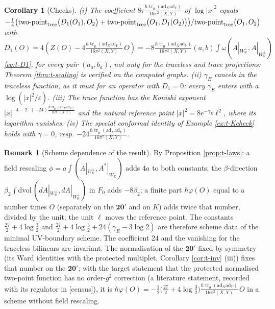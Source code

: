 \documentclass[11pt]{report}
\theoremstyle{plain}
\newtheorem{corollary}[theorem]{Corollary}
\theoremstyle{definition}
\newtheorem{remark}[theorem]{Remark}
\numberwithin{equation}{chapter}
\newcommand{\unit}{\tfrac{\hbar\operatorname{tr}_{\mathfrak g}(\mathrm{ad}_X\mathrm{ad}_Y)}{16\pi^2(X,Y)}}
\newcommand{\Wp}{W_{\mathbb R}^\perp}
\newcommand{\TPz}[2]{\mathrm{two\mbox{-}point}_{\rm tree}\big(#1,#2\big)}
\begin{document}
\begin{corollary}[Checks]
\label{cor:t-checks}
(i) The coefficient $8\tau\unit$ of $\log|x|^2$ equals $-\tfrac14\big(\TPz{D_1(O_1)}{O_2}+\TPz{O_1}{D_1(O_2)}\big)/\TPz{O_1}{O_2}$ with $D_1(O)=4(Z(O)-4\unit\,O)=-8\unit(a,b)\int\omega(A|_{\Wp},A|_{\Wp})$ \eqref{eq:t-D1}, for every pair $(a_a,b_a)$, not only for the traceless and trace projections: Theorem \ref{thm:t-scaling} is verified on the computed graphs. (ii) $\gamma_E$ cancels in the traceless function, as it must for an operator with $D_1=0$: every $\gamma_E$ enters with a $\log(|x|^2/\varepsilon)$. (iii) The trace function has the Konishi exponent $|x|^{-4-2\cdot(-24)\unit}$ and the natural reference point $|x|^2=8e^{-\gamma_E}\ell^2$, where its logarithm vanishes. (iv) The special conformal identity of Example \ref{ex:t-Kcheck} holds with $\gamma=0$, resp. $-24\unit$.
\end{corollary}

\begin{remark}[Scheme dependence of the result]
By Proposition \ref{prop:t-laws}: a field rescaling $\phi=a\int(A|_{\Wp},A^*|_{\Wp})$ adds $4a$ to both constants; the $\beta$-direction $\beta_2\int\mathrm{dvol}\,(dA|_{\Wp},dA|_{\Wp})$ in $F_0$ adds $-8\beta_2$; a finite part $\hbar\varphi(O)$ equal to a number times $O$ (separately on the $\mathbf{20'}$ and on $K$) adds twice that number, divided by the unit; the unit $\ell$ moves the reference point. The constants $\tfrac{27}2+4\log\tfrac32$ and $\tfrac{27}2+4\log\tfrac32+24(\gamma_E-3\log2)$ are therefore scheme data of the minimal UV-boundary scheme. The coefficient $24$ and the vanishing for the traceless bilinears are invariant. The normalisation of the $\mathbf{20'}$ fixed by symmetry (its Ward identities with the protected multiplet, Corollary \ref{cor:t-inv} (iii)) fixes that number on the $\mathbf{20'}$; with the target statement that the protected normalised two-point function has no order-$g^2$ correction (a literature statement, recorded with its regulator in [census]), it is $\hbar\varphi(O)=-\tfrac12\big(\tfrac{27}2+4\log\tfrac32\big)\unit\,O$ in a scheme without field rescaling.
\end{remark}
\end{document}
